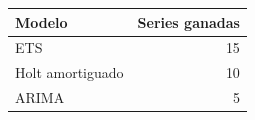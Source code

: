 
\begin{tabular}{lr}
\toprule
Modelo & Series ganadas\\
\midrule
ETS & 15\\
Holt amortiguado & 10\\
ARIMA & 5\\
\bottomrule
\end{tabular}